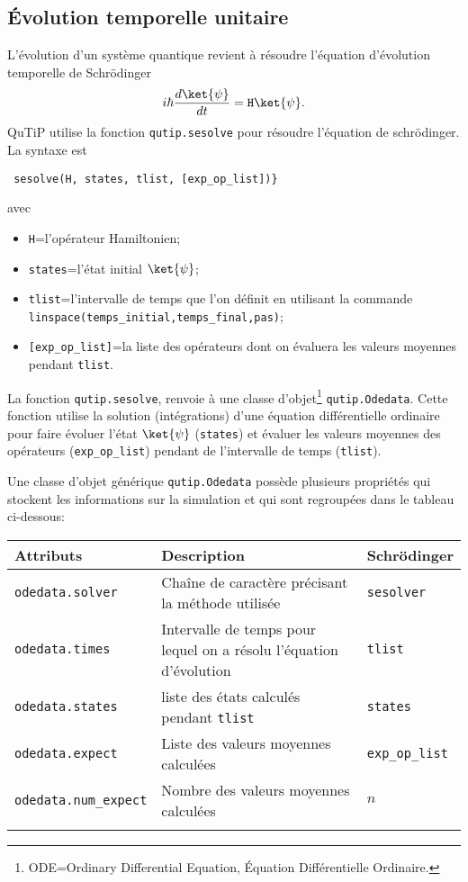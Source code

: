 \subsection{Évolution temporelle unitaire}

L'évolution d'un système quantique revient à résoudre l'équation d'évolution 
temporelle de Schr\"odinger
\begin{equation}
i\hbar\dfrac{d\ket{\psi}}{dt}=\texttt{H}\ket{\psi}.
\end{equation}
QuTiP utilise la fonction \texttt{qutip.sesolve} pour résoudre l'équation de 
schr\"odinger. La syntaxe est\\
\begin{lstlisting}
 sesolve(H, states, tlist, [exp_op_list])}
\end{lstlisting}
avec
\begin{itemize}
\item \texttt{H}=l'opérateur Hamiltonien;
\item \texttt{states}=l'état initial $\ket{\psi}$;
\item \texttt{tlist}=l'intervalle de temps que l'on définit en utilisant la
commande \texttt{linspace(temps\_initial,temps\_final,pas)};
\item \texttt{[exp\_op\_list]}=la liste des opérateurs dont on évaluera les 
valeurs moyennes pendant \texttt{tlist}.
\end{itemize}

La fonction \texttt{qutip.sesolve}, renvoie à une classe 
d'objet\footnote{ODE=Ordinary Differential Equation, Équation Différentielle 
Ordinaire.} \texttt{qutip.Odedata}. Cette fonction utilise la solution 
(intégrations) d'une équation différentielle ordinaire pour faire évoluer 
l'état $\ket{\psi}$ (\texttt{states}) et évaluer les valeurs moyennes 
des opérateurs (\texttt{exp\_op\_list}) pendant de l'intervalle de temps 
(\texttt{tlist}).

Une classe d'objet générique \texttt{qutip.Odedata} possède plusieurs propriétés 
qui stockent les informations sur la simulation et qui sont regroupées dans le 
tableau ci-dessous:

\begin{center}
\begin{tabular}{|l|l|l} \hline \hline
\textbf{Attributs} & \textbf{Description} & \textbf{Schrödinger}\\ \hline \hline
\texttt{odedata.solver} & Chaîne de caractère précisant la méthode utilisée & 
\texttt{sesolver}\\ \hline
\texttt{odedata.times} & Intervalle de temps pour lequel on a résolu 
l'équation d'évolution & \texttt{tlist}\\ \hline
\texttt{odedata.states} & liste des états calculés pendant \texttt{tlist} & 
\texttt{states} \\ \hline
\texttt{odedata.expect} & Liste des valeurs moyennes calculées & 
\texttt{exp\_op\_list} \\ \hline
\texttt{odedata.num\_expect} & Nombre des valeurs moyennes calculées & $n$ \\ 
\hline
\\\hline
\end{tabular}
\end{center}


